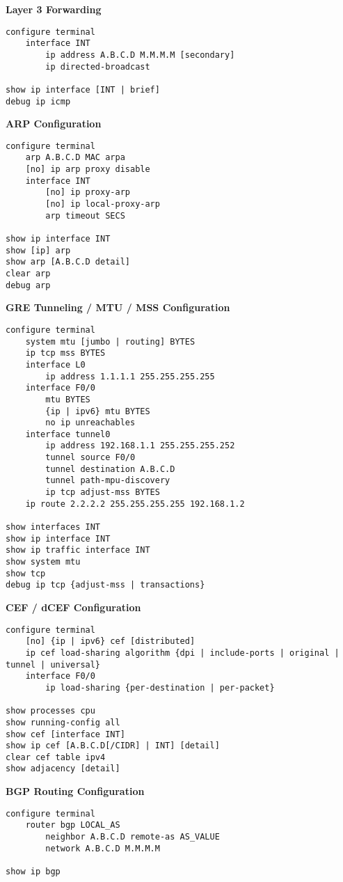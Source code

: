 \documentclass[12pt]{article}
\begin{document}
	\textbf{Layer 3 Forwarding}
	\begin{lstlisting}
configure terminal
	interface INT
		ip address A.B.C.D M.M.M.M [secondary]
		ip directed-broadcast

show ip interface [INT | brief]
debug ip icmp
	\end{lstlisting}

	\textbf{ARP Configuration}
	\begin{lstlisting}
configure terminal
	arp A.B.C.D MAC arpa
	[no] ip arp proxy disable
	interface INT
		[no] ip proxy-arp
		[no] ip local-proxy-arp
		arp timeout SECS

show ip interface INT
show [ip] arp
show arp [A.B.C.D detail]
clear arp
debug arp
	\end{lstlisting}

	\textbf{GRE Tunneling / MTU / MSS Configuration}
	\begin{lstlisting}
configure terminal
	system mtu [jumbo | routing] BYTES
	ip tcp mss BYTES
	interface L0
		ip address 1.1.1.1 255.255.255.255
	interface F0/0
		mtu BYTES
		{ip | ipv6} mtu BYTES
		no ip unreachables
	interface tunnel0
		ip address 192.168.1.1 255.255.255.252
		tunnel source F0/0
		tunnel destination A.B.C.D
		tunnel path-mpu-discovery
		ip tcp adjust-mss BYTES
	ip route 2.2.2.2 255.255.255.255 192.168.1.2

show interfaces INT
show ip interface INT
show ip traffic interface INT
show system mtu
show tcp
debug ip tcp {adjust-mss | transactions}
	\end{lstlisting}

	\textbf{CEF / dCEF Configuration}
	\begin{lstlisting}
configure terminal
	[no] {ip | ipv6} cef [distributed]
	ip cef load-sharing algorithm {dpi | include-ports | original | tunnel | universal}
	interface F0/0
		ip load-sharing {per-destination | per-packet}

show processes cpu
show running-config all
show cef [interface INT]
show ip cef [A.B.C.D[/CIDR] | INT] [detail]
clear cef table ipv4
show adjacency [detail]
	\end{lstlisting}

	\textbf{BGP Routing Configuration}
	\begin{lstlisting}
configure terminal
	router bgp LOCAL_AS
		neighbor A.B.C.D remote-as AS_VALUE
		network A.B.C.D M.M.M.M

show ip bgp
	\end{lstlisting}


\end{document}
